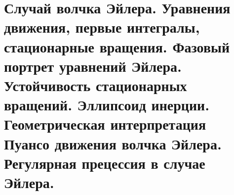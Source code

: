 \section{Случай волчка Эйлера. Уравнения движения, первые интегралы, стационарные вращения. Фазовый портрет уравнений Эйлера. Устойчивость стационарных вращений. Эллипсоид инерции. Геометрическая интерпретация Пуансо движения волчка Эйлера. Регулярная прецессия в случае Эйлера.}\label{chasec15}



\newpage